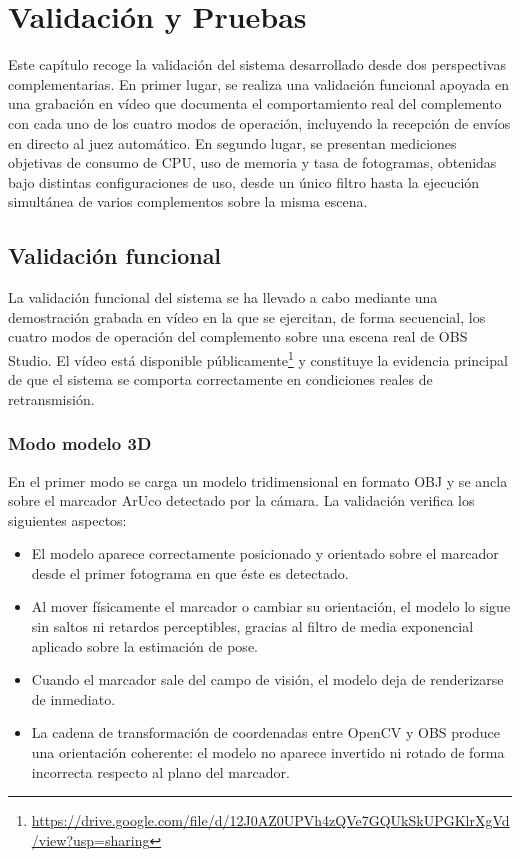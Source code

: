 \chapter{Validación y Pruebas}
\label{cap:validacion}


Este capítulo recoge la validación del sistema desarrollado desde dos perspectivas complementarias. En primer lugar, se realiza una validación funcional apoyada en una grabación en vídeo que documenta el comportamiento real del complemento con cada uno de los cuatro modos de operación, incluyendo la recepción de envíos en directo al juez automático. En segundo lugar, se presentan mediciones objetivas de consumo de CPU, uso de memoria y tasa de fotogramas, obtenidas bajo distintas configuraciones de uso, desde un único filtro hasta la ejecución simultánea de varios complementos sobre la misma escena.

\section{Validación funcional}
\label{sec:validacion_funcional}

La validación funcional del sistema se ha llevado a cabo mediante una demostración grabada en vídeo en la que se ejercitan, de forma secuencial, los cuatro modos de operación del complemento sobre una escena real de OBS Studio. El vídeo está disponible públicamente\footnote{\url{https://drive.google.com/file/d/12J0AZ0UPVh4zQVe7GQUkSkUPGKlrXgVd/view?usp=sharing}} \citep{VideoValidacion} y constituye la evidencia principal de que el sistema se comporta correctamente en condiciones reales de retransmisión.

\subsection{Modo modelo 3D}
\label{sec:val_modo3d}

En el primer modo se carga un modelo tridimensional en formato OBJ y se ancla sobre el marcador ArUco detectado por la cámara. La validación verifica los siguientes aspectos:

\begin{itemize}
  \item El modelo aparece correctamente posicionado y orientado sobre el marcador desde el primer fotograma en que éste es detectado.
  \item Al mover físicamente el marcador o cambiar su orientación, el modelo lo sigue sin saltos ni retardos perceptibles, gracias al filtro de media exponencial aplicado sobre la estimación de pose.
  \item Cuando el marcador sale del campo de visión, el modelo deja de renderizarse de inmediato.
  \item La cadena de transformación de coordenadas entre OpenCV y OBS produce una orientación coherente: el modelo no aparece invertido ni rotado de forma incorrecta respecto al plano del marcador.
\end{itemize}

